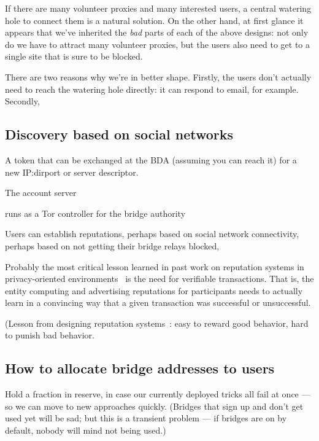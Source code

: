 \documentclass{llncs}
\begin{document}
If there are many volunteer proxies and many interested users, a central
watering hole to connect them is a natural solution. On the other hand,
at first glance it appears that we've inherited the \emph{bad} parts of
each of the above designs: not only do we have to attract many volunteer
proxies, but the users also need to get to a single site that is sure
to be blocked.

There are two reasons why we're in better shape. Firstly, the users don't
actually need to reach the watering hole directly: it can respond to
email, for example. Secondly, 




\subsection{Discovery based on social networks}

A token that can be exchanged at the BDA (assuming you
can reach it) for a new IP:dirport or server descriptor.

The account server

runs as a Tor controller for the bridge authority

Users can establish reputations, perhaps based on social network
connectivity, perhaps based on not getting their bridge relays blocked,

Probably the most critical lesson learned in past work on reputation
systems in privacy-oriented environments~\cite{rep-anon} is the need for
verifiable transactions. That is, the entity computing and advertising
reputations for participants needs to actually learn in a convincing
way that a given transaction was successful or unsuccessful.

(Lesson from designing reputation systems~\cite{rep-anon}: easy to
reward good behavior, hard to punish bad behavior.

\subsection{How to allocate bridge addresses to users}

Hold a fraction in reserve, in case our currently deployed tricks
all fail at once --- so we can move to new approaches quickly.
(Bridges that sign up and don't get used yet will be sad; but this
is a transient problem --- if bridges are on by default, nobody will
mind not being used.)
\end{document}
